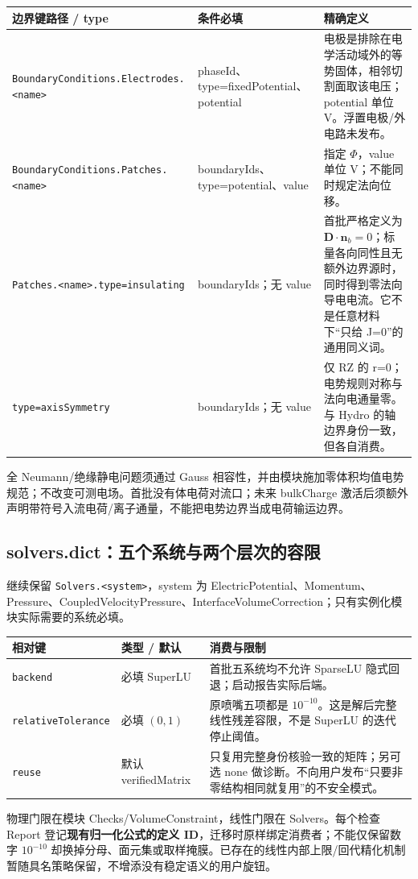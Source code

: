 \documentclass[UTF8,a4paper,11pt,fontset=fandol]{ctexart}
\numberwithin{equation}{section}
\newcommand{\code}[1]{\nolinkurl{#1}}
\begin{document}
\begin{longtable}{@{}P{.36\textwidth}P{.23\textwidth}P{.35\textwidth}@{}}
\toprule 边界键路径 / type & 条件必填 & 精确定义\\\midrule\endhead
\code{BoundaryConditions.Electrodes.<name>} & phaseId、type=fixedPotential、potential & 电极是排除在电学活动域外的等势固体，相邻切割面取该电压；potential 单位 V。浮置电极/外电路未发布。\\
\code{BoundaryConditions.Patches.<name>} & boundaryIds、type=potential、value & 指定 $\Phi$，value 单位 V；不能同时规定法向位移。\\
\code{Patches.<name>.type=insulating} & boundaryIds；无 value & 首批严格定义为 $\bm D\cdot\bm n_b=0$；标量各向同性且无额外边界源时，同时得到零法向导电电流。它不是任意材料下“只给 J=0”的通用同义词。\\
\code{type=axisSymmetry} & boundaryIds；无 value & 仅 RZ 的 r=0；电势规则对称与法向电通量零。与 Hydro 的轴边界身份一致，但各自消费。\\
\bottomrule
\end{longtable}
全 Neumann/绝缘静电问题须通过 Gauss 相容性，并由模块施加零体积均值电势规范；不改变可测电场。首批没有体电荷对流口；未来 bulkCharge 激活后须额外声明带符号入流电荷/离子通量，不能把电势边界当成电荷输运边界。

\subsection{solvers.dict：五个系统与两个层次的容限}
继续保留 \code{Solvers.<system>}，system 为 ElectricPotential、Momentum、Pressure、CoupledVelocityPressure、InterfaceVolumeCorrection；只有实例化模块实际需要的系统必填。
\begin{longtable}{@{}P{.29\textwidth}P{.26\textwidth}P{.39\textwidth}@{}}
\toprule 相对键 & 类型 / 默认 & 消费与限制\\\midrule\endhead
\code{backend} & 必填 SuperLU & 首批五系统均不允许 SparseLU 隐式回退；启动报告实际后端。\\
\code{relativeTolerance} & 必填 $(0,1)$ & 原喷嘴五项都是 $10^{-10}$。这是解后完整线性残差容限，不是 SuperLU 的迭代停止阈值。\\
\code{reuse} & 默认 verifiedMatrix & 只复用完整身份核验一致的矩阵；另可选 none 做诊断。不向用户发布“只要非零结构相同就复用”的不安全模式。\\
\bottomrule
\end{longtable}
物理门限在模块 Checks/VolumeConstraint，线性门限在 Solvers。每个检查 Report 登记\textbf{现有归一化公式的定义 ID}，迁移时原样绑定消费者；不能仅保留数字 $10^{-10}$ 却换掉分母、面元集或取样掩膜。已存在的线性内部上限/回代精化机制暂随具名策略保留，不增添没有稳定语义的用户旋钮。
\end{document}
